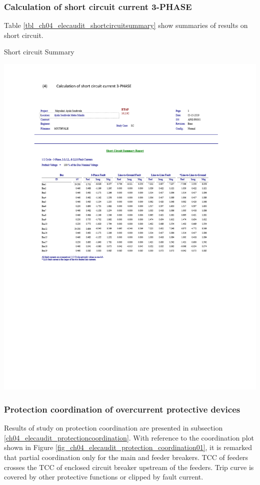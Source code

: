 \subsubsection{Calculation of short circuit current 3-PHASE}
Table \ref{tbl_ch04_elecaudit_shortcircuitsummary} show summaries of results on short circuit.


\begin{table}
	\caption{Short circuit Summary}
	\label{tbl_ch04_elecaudit_shortcircuitsummary}
	\includegraphics[width=\textwidth]{tables/tbl_ch04_elecaudit_shortcircuitsummary} \\

\end{table}


\subsubsection{Protection coordination of overcurrent protective devices}
Results of study on protection coordination are presented in subsection \ref{ch04_elecaudit_protectioncoordination}. With reference to the coordination plot shown in Figure \ref{fig_ch04_elecaudit_protection_coordination01}, it is remarked that partial coordination only for the main and feeder breakers. TCC of feeders crosses the TCC of enclosed circuit breaker upstream of the feeders. Trip curve is covered by other protective functions or clipped by fault current.

